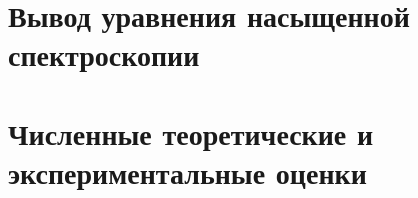 



\section{Вывод уравнения насыщенной спектроскопии}





\newpage


\section{Численные теоретические и экспериментальные оценки}


